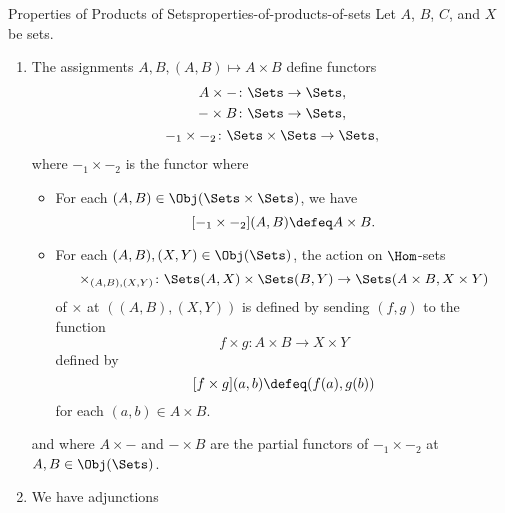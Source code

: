 \begin{proposition}{Properties of Products of Sets}{properties-of-products-of-sets}%
    Let $A$, $B$, $C$, and $X$ be sets.
    \begin{enumerate}
        \item\label{properties-of-products-of-sets-functoriality}The assignments $A,B,(A,B)\mapsto A\times B$ define functors
            \begin{gather*}
                \begin{aligned}
                    A\times-    &\colon            \Sets \to \Sets,\\
                    -\times B   &\colon \Sets            \to \Sets,
                \end{aligned}\\
                -_{1}\times-_{2} \colon \Sets\times\Sets \to \Sets,
            \end{gather*}
            where $-_{1}\times-_{2}$ is the functor where
            \begin{itemize}
                \item{}For each $(A,B)\in\Obj(\Sets\times\Sets)$, we have
                    \[
                        [-_{1}\times-_{2}](A,B)%
                        \defeq
                        A\times B.%
                    \]%
                \item{}For each $(A,B),(X,Y)\in\Obj(\Sets)$, the action on $\Hom$-sets
                    \[
                        \times_{(A,B),(X,Y)}
                        \colon
                        \Sets(A,X)\times\Sets(B,Y)%
                        \to%
                        \Sets(A\times B,X\times Y)%
                    \]%
                    of $\times$ at $((A,B),(X,Y))$ is defined by sending $(f,g)$ to the function
                    \[
                        f\times g%
                        \colon%
                        A\times B%
                        \to%
                        X\times Y%
                    \]%
                    defined by
                    \[
                        [f\times g](a,b)%
                        \defeq%
                        (f(a),g(b))
                    \]%
                    for each $(a,b)\in A\times B$.
            \end{itemize}
            and where $A\times-$ and $-\times B$ are the partial functors of $-_{1}\times-_{2}$ at $A,B\in\Obj(\Sets)$.
        \item\label{properties-of-products-of-sets-adjointness}We have adjunctions

\end{enumerate}
\end{proposition}
